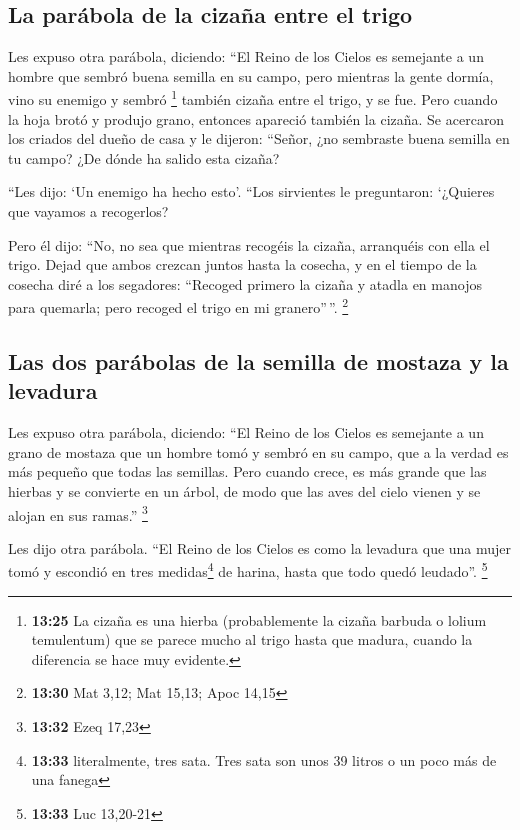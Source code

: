 \begin{paracol}{2}
\hypertarget{la-paruxe1bola-de-la-cizauxf1a-entre-el-trigo}{%
\subsection{La parábola de la cizaña entre el
trigo}\label{la-paruxe1bola-de-la-cizauxf1a-entre-el-trigo}}

 Les expuso otra parábola, diciendo: ``El Reino de los
Cielos es semejante a un hombre que sembró buena semilla en su campo,
 pero mientras la gente dormía, vino su enemigo y sembró
\footnote{\textbf{13:25} La cizaña es una hierba (probablemente la
  cizaña barbuda o lolium temulentum) que se parece mucho al trigo hasta
  que madura, cuando la diferencia se hace muy evidente.} también cizaña
entre el trigo, y se fue.  Pero cuando la hoja brotó y
produjo grano, entonces apareció también la cizaña.  Se
acercaron los criados del dueño de casa y le dijeron: ``Señor, ¿no
sembraste buena semilla en tu campo? ¿De dónde ha salido esta cizaña?

 ``Les dijo: `Un enemigo ha hecho esto'. ``Los sirvientes
le preguntaron: `¿Quieres que vayamos a recogerlos?

 Pero él dijo: ``No, no sea que mientras recogéis la
cizaña, arranquéis con ella el trigo.  Dejad que ambos
crezcan juntos hasta la cosecha, y en el tiempo de la cosecha diré a los
segadores: ``Recoged primero la cizaña y atadla en manojos para
quemarla; pero recoged el trigo en mi granero''\,''. \footnote{\textbf{13:30}
  Mat 3,12; Mat 15,13; Apoc 14,15}

\hypertarget{las-dos-paruxe1bolas-de-la-semilla-de-mostaza-y-la-levadura}{%
\subsection{Las dos parábolas de la semilla de mostaza y la
levadura}\label{las-dos-paruxe1bolas-de-la-semilla-de-mostaza-y-la-levadura}}

 Les expuso otra parábola, diciendo: ``El Reino de los
Cielos es semejante a un grano de mostaza que un hombre tomó y sembró en
su campo,  que a la verdad es más pequeño que todas las
semillas. Pero cuando crece, es más grande que las hierbas y se
convierte en un árbol, de modo que las aves del cielo vienen y se alojan
en sus ramas.'' \footnote{\textbf{13:32} Ezeq 17,23}

 Les dijo otra parábola. ``El Reino de los Cielos es como
la levadura que una mujer tomó y escondió en tres medidas\footnote{\textbf{13:33}
  literalmente, tres sata. Tres sata son unos 39 litros o un poco más de
  una fanega} de harina, hasta que todo quedó leudado''. \footnote{\textbf{13:33}
  Luc 13,20-21}


\end{paracol}
